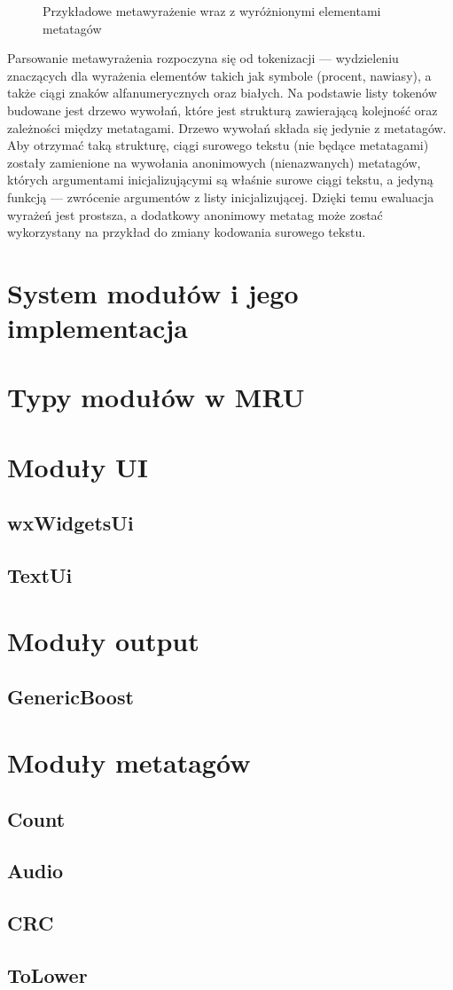 \begin{figure}
\begin{center}
\end{center}
\caption{Przykładowe metawyrażenie wraz z wyróżnionymi elementami metatagów}
\end{figure}

Parsowanie metawyrażenia rozpoczyna się od tokenizacji --- wydzieleniu znaczących dla wyrażenia elementów takich jak symbole (procent, nawiasy), a także ciągi znaków alfanumerycznych oraz białych. Na podstawie listy tokenów budowane jest drzewo wywołań, które jest strukturą zawierającą kolejność oraz zależności między metatagami.
Drzewo wywołań składa się jedynie z metatagów. Aby otrzymać taką strukturę, ciągi surowego tekstu (nie będące metatagami) zostały zamienione na wywołania anonimowych (nienazwanych) metatagów, których argumentami inicjalizującymi są właśnie surowe ciągi tekstu, a jedyną funkcją --- zwrócenie argumentów z listy inicjalizującej. Dzięki temu ewaluacja wyrażeń jest prostsza, a dodatkowy anonimowy metatag może zostać wykorzystany na przykład do zmiany kodowania surowego tekstu.

\section{System modułów i jego implementacja}

\section{Typy modułów w MRU}

\section{Moduły UI}
\subsection{wxWidgetsUi}
\subsection{TextUi}

\section{Moduły output}
\subsection{GenericBoost}

\section{Moduły metatagów}
\subsection{Count}
\subsection{Audio}
\subsection{CRC}
\subsection{ToLower}

\label{}
